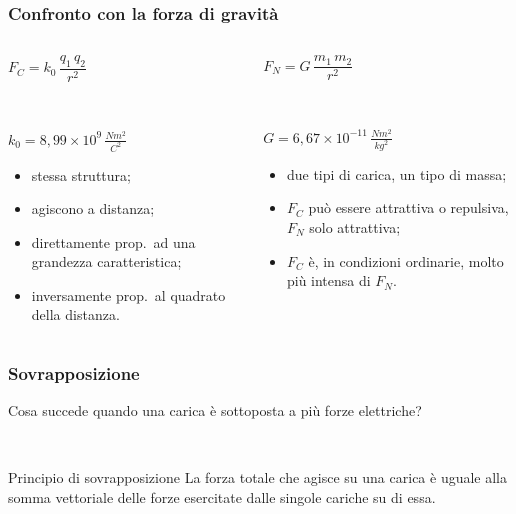 \documentclass[]{beamer}
\theoremstyle{plain}
\begin{document}
\begin{frame}
\frametitle{Confronto con la forza di gravità}

\begin{columns}
\begin{column}{0.5\textwidth}
\begin{center}
\colorbox{marroncino!30}{$ F_C = k_0 \,  \dfrac{q_1 \, q_2}{r^2} $}

~

$ k_0 = 8,99 \times 10^9 \, \frac{Nm^2}{C^2}$
\end{center}
\begin{itemize}
  \item<2-> \alert<2>{stessa struttura};
  \item<3-> \alert<3>{agiscono a distanza};
  \item<4-> \alert<4>{direttamente prop.~ad una grandezza caratteristica};
  \item<5-> \alert<5>{inversamente prop.~al quadrato della distanza}.
\end{itemize}
\end{column}
\begin{column}{0.5\textwidth}
\begin{center}
\colorbox{marroncino!30}{$ F_N = G \,  \dfrac{m_1 \, m_2}{r^2} $}

~

$ G = 6,67 \times 10^{-11} \, \frac{Nm^2}{kg^2}$
\end{center}
\begin{itemize}
  \item<6-> \alert<6>{due tipi di carica, un tipo di massa};
  \item<7-> \alert<7>{$ F_C $ può essere attrattiva o repulsiva, $ F_N $ solo attrattiva};
  \item<8-> \alert<8>{$ F_C $ è, in condizioni ordinarie, molto più intensa di $ F_N $}.
\end{itemize}
\end{column}
\end{columns}
\end{frame}



\begin{frame}
\frametitle{Sovrapposizione}
Cosa succede quando una carica è sottoposta a più forze elettriche?\pause

~

\begin{block}{Principio di sovrapposizione}
La forza totale che agisce su una carica è uguale alla \alert{somma vettoriale} delle forze esercitate dalle singole cariche su di essa.
\end{block}

\end{frame}
\end{document}
